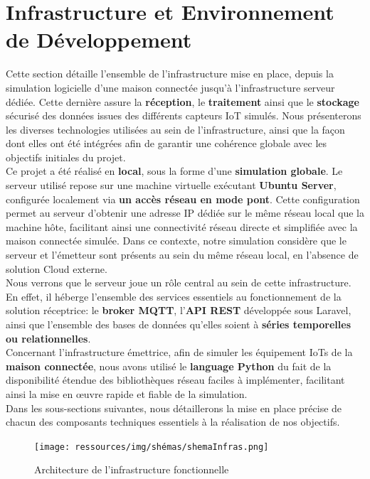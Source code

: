 \documentclass[10pt, a4paper]{report}
\begin{document}
	\section{Infrastructure et Environnement de Développement}
	Cette section détaille l'ensemble de l’infrastructure mise en place, depuis la simulation logicielle d'une maison connectée jusqu'à l'infrastructure serveur dédiée. Cette dernière assure la \textbf{réception}, le \textbf{traitement} ainsi que le \textbf{stockage} sécurisé des données issues des différents capteurs IoT simulés. Nous présenterons les diverses technologies utilisées au sein de l'infrastructure, ainsi que la façon dont elles ont été intégrées afin de garantir une cohérence globale avec les objectifs initiales du projet.\\
	Ce projet a été réalisé en \textbf{local}, sous la forme d'une \textbf{simulation globale}. Le serveur utilisé repose sur une machine virtuelle exécutant \textbf{Ubuntu Server}, configurée localement via \textbf{un accès réseau en mode pont}. Cette configuration permet au serveur d'obtenir une adresse IP dédiée sur le même réseau local que la machine hôte, facilitant ainsi une connectivité réseau directe et simplifiée avec la maison connectée simulée. Dans ce contexte, notre simulation considère que le serveur et l’émetteur sont présents au sein du même réseau local, en l'absence de solution Cloud externe.\\
	Nous verrons que le serveur joue un rôle central au sein de cette infrastructure. En effet, il héberge l'ensemble des services essentiels au fonctionnement de la solution réceptrice: le \textbf{broker MQTT}, l'\textbf{API REST} développée sous Laravel, ainsi que l'ensemble des bases de données qu'elles soient à\textbf{ séries temporelles ou relationnelles}.\\
	Concernant l'infrastructure émettrice, afin de simuler les équipement IoTs de la \textbf{maison connectée}, nous avons utilisé le\textbf{ language Python} du fait de la disponibilité étendue des bibliothèques réseau faciles à implémenter, facilitant ainsi la mise en œuvre rapide et fiable de la simulation. \\
	Dans les sous-sections suivantes, nous détaillerons la mise en place précise de chacun des composants techniques essentiels à la réalisation de nos objectifs.
		\begin{figure}[h!]
		\centering
		\texttt{[image: ressources/img/shémas/shemaInfras.png]}
		\caption{Architecture de l'infrastructure fonctionnelle}
		\label{fig:archiInfra}
	\end{figure}
	
\end{document}
